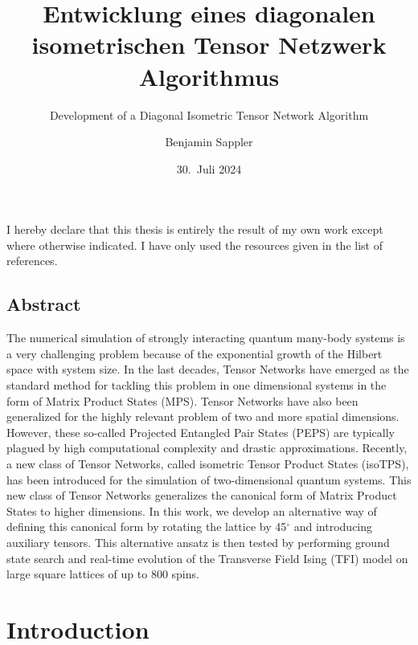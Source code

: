\documentclass[encoding=utf8,british]{template/thesis}
\title{Entwicklung eines diagonalen isometrischen Tensor Netzwerk Algorithmus}
\subtitle{Development of a Diagonal Isometric Tensor Network Algorithm}
\author{Benjamin Sappler}
\date{30.~Juli 2024}
\begin{document}
	\frontmatter
	\maketitle
	
	\newpage
	\begin{refsection}
	\thispagestyle{empty}
	
	\null\vfill
	\raggedright\noindent
	I hereby declare that this thesis is entirely the result of my own work except where otherwise indicated. I have only used the resources given in the list of references. \par
	\vspace{2cm}
	\noindent
	\par
	
	\newpage
	\thispagestyle{empty}
	
	\justifying
	
	\section*{Abstract}
	The numerical simulation of strongly interacting quantum many-body systems is a very challenging problem because of the exponential growth of the Hilbert space with system size. In the last decades, Tensor Networks have emerged as the standard method for tackling this problem in one dimensional systems in the form of Matrix Product States (MPS). Tensor Networks have also been generalized for the highly relevant problem of two and more spatial dimensions. However, these so-called Projected Entangled Pair States (PEPS) are typically plagued by high computational complexity and drastic approximations. Recently, a new class of Tensor Networks, called isometric Tensor Product States (isoTPS), has been introduced for the simulation of two-dimensional quantum systems. This new class of Tensor Networks generalizes the canonical form of Matrix Product States to higher dimensions. In this work, we develop an alternative way of defining this canonical form by rotating the lattice by 45$^\circ$ and introducing auxiliary tensors. This alternative ansatz is then tested by performing ground state search and real-time evolution of the Transverse Field Ising (TFI) model on large square lattices of up to 800 spins.
	
	\tableofcontents
	\thispagestyle{empty}
	
	\mainmatter
	
	\chapter{Introduction}
	\label{chap:introduction}
	
	

\end{refsection}
\end{document}
